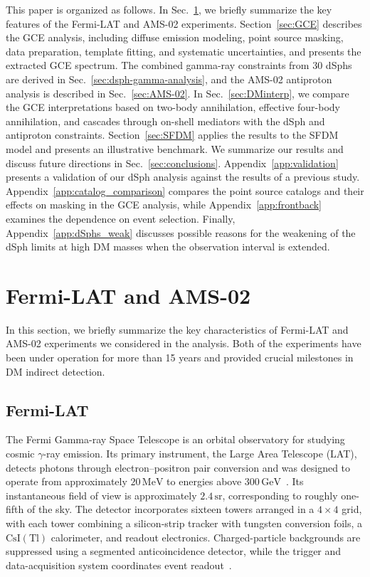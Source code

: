 \documentclass[superscriptaddress,
showpacs,preprintnumbers,nofootinbib,eqsecnum,amsmath,amssymb,aps,11pt, groupedaddress, floatfix]{revtex4-2}
\begin{document}
This paper is organized as follows.
In Sec.~\ref{sec:FermiLATandAMS02}, we briefly summarize the key features of the Fermi-LAT and AMS-02 experiments.
Section~\ref{sec:GCE} describes the GCE analysis, including diffuse emission modeling, point source masking, data preparation,
template fitting, and systematic uncertainties, and presents
the extracted GCE spectrum.
The combined gamma-ray constraints from 30 dSphs are derived
in Sec.~\ref{sec:dsph-gamma-analysis}, and the AMS-02 antiproton
analysis is described in Sec.~\ref{sec:AMS-02}.
In Sec.~\ref{sec:DMinterp}, we compare the GCE interpretations
based on two-body annihilation, effective four-body annihilation,
and cascades through on-shell mediators with the dSph and
antiproton constraints.
Section~\ref{sec:SFDM} applies the results to the SFDM model
and presents an illustrative benchmark.
We summarize our results and discuss future directions in
Sec.~\ref{sec:conclusions}.
Appendix~\ref{app:validation} presents a validation of our
dSph analysis against the results of a previous study.
Appendix~\ref{app:catalog_comparison} compares the point source
catalogs and their effects on masking in the GCE analysis,
while Appendix~\ref{app:frontback} examines the dependence
on event selection.
Finally, Appendix~\ref{app:dSphs_weak} discusses possible reasons for the weakening of the dSph limits at high DM masses when the observation interval is extended.


 






\section{Fermi-LAT and AMS-02}
\label{sec:FermiLATandAMS02}

In this section, we briefly summarize the key characteristics of Fermi-LAT and AMS-02 experiments 
we considered in the analysis.
Both of the experiments have been under operation for more than 15 years and provided crucial milestones in DM indirect detection.

\subsection{Fermi-LAT}

The Fermi Gamma-ray Space Telescope is an orbital observatory for studying cosmic $\gamma$-ray emission. 
Its primary instrument, the Large Area Telescope (LAT), detects photons through electron–positron pair conversion and was designed to operate from approximately $20\,\mathrm{MeV}$ to energies above $300\,\mathrm{GeV}$~\cite{Fermi-LAT:2009ihh, Fermi-LAT:2012fsm}. 
Its instantaneous field of view is approximately $2.4\,\mathrm{sr}$, corresponding to roughly one-fifth of the sky. 
The detector incorporates sixteen towers arranged in a $4\times4$ grid, with each tower combining a silicon-strip tracker with tungsten conversion foils, a $\mathrm{CsI(Tl)}$ calorimeter, and readout electronics. 
Charged-particle backgrounds are suppressed using a segmented anticoincidence detector, while the trigger and data-acquisition system coordinates event readout~\cite{Fermi-LAT:2009ihh}.
\end{document}
